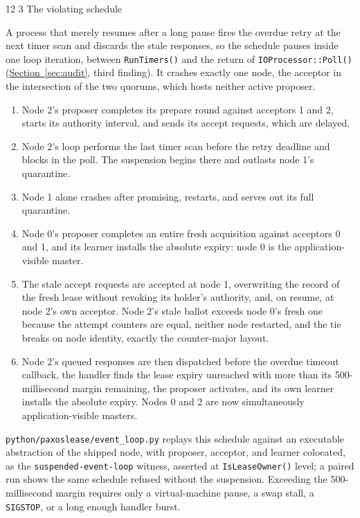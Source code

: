 \documentclass[final,5p,times,twocolumn,number]{elsarticle}
\makeatletter
\newcommand{\code}[1]{\texttt{#1}}
\newcommand{\secref}[1]{\hyperref[#1]{Section~\ref*{#1}}}
\renewcommand\subsection{\@startsection{subsection}{2}{\z@}%
           {12\p@ \@plus 6\p@ \@minus 3\p@}%
           {3\p@ \@plus 6\p@ \@minus 3\p@}%
           {\normalfont\normalsize\bfseries}}
\makeatother
\begin{document}
\subsection{The violating schedule}

A process that merely resumes after a long pause fires the overdue retry at the next timer scan and discards the stale responses, so the schedule pauses inside one loop iteration, between \code{RunTimers()} and the return of \code{IOProcessor::Poll()} (\secref{sec:audit}, third finding).  It crashes exactly one node, the acceptor in the intersection of the two quorums, which hosts neither active proposer.

\begin{enumerate}
\itemsep0.15em
\item Node 2's proposer completes its prepare round against acceptors 1 and 2, starts its authority interval, and sends its accept requests, which are delayed.
\item Node 2's loop performs the last timer scan before the retry deadline and blocks in the poll.  The suspension begins there and outlasts node 1's quarantine.
\item Node 1 alone crashes after promising, restarts, and serves out its full quarantine.
\item Node 0's proposer completes an entire fresh acquisition against acceptors 0 and 1, and its learner installs the absolute expiry: node 0 is the application-visible master.
\item The stale accept requests are accepted at node 1, overwriting the record of the fresh lease without revoking its holder's authority, and, on resume, at node 2's own acceptor.  Node 2's stale ballot exceeds node 0's fresh one because the attempt counters are equal, neither node restarted, and the tie breaks on node identity, exactly the counter-major layout.
\item Node 2's queued responses are then dispatched before the overdue timeout callback, the handler finds the lease expiry unreached with more than its 500-millisecond margin remaining, the proposer activates, and its own learner installs the absolute expiry.  Nodes 0 and 2 are now simultaneously application-visible masters.
\end{enumerate}

\code{python/paxoslease/event\_loop.py} replays this schedule against an executable abstraction of the shipped node, with proposer, acceptor, and learner colocated, as the \code{suspended-event-loop} witness, asserted at \code{IsLeaseOwner()} level; a paired run shows the same schedule refused without the suspension.  Exceeding the 500-millisecond margin requires only a virtual-machine pause, a swap stall, a \code{SIGSTOP}, or a long enough handler burst.
\end{document}
